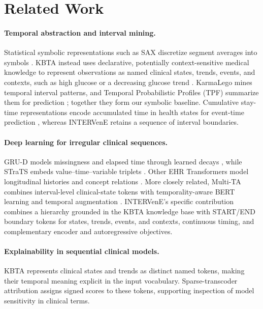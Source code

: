 \documentclass[letterpaper]{article} %
\begin{document}
\section{Related Work}

\paragraph{Temporal abstraction and interval mining.}
Statistical symbolic representations such as SAX discretize segment averages into symbols \citep{lin2003symbolic}. KBTA instead uses declarative, potentially context-sensitive medical knowledge to represent observations as named clinical states, trends, events, and contexts, such as high glucose or a decreasing glucose trend \citep{shahar1997framework}. KarmaLego mines temporal interval patterns, and Temporal Probabilistic Profiles (TPF) summarize them for prediction \citep{moskovitch2015karmalego,sheetrit2019tpf}; together they form our symbolic baseline. Cumulative stay-time representations encode accumulated time in health states for event-time prediction \citep{katsuki2022cumulative}, whereas INTERVenE retains a sequence of interval boundaries.

\paragraph{Deep learning for irregular clinical sequences.}
GRU-D models missingness and elapsed time through learned decays \citep{che2018recurrent}, while STraTS embeds value--time--variable triplets \citep{tipirneni2022strats}. Other EHR Transformers model longitudinal histories and concept relations \citep{li2020behrt,yang2023transformehr,huang2024heart}. More closely related, Multi-TA combines interval-level clinical-state tokens with temporality-aware BERT learning and temporal augmentation \citep{sohn2024multi}. INTERVenE's specific contribution combines a hierarchy grounded in the KBTA knowledge base with START/END boundary tokens for states, trends, events, and contexts, continuous timing, and complementary encoder and autoregressive objectives.

\paragraph{Explainability in sequential clinical models.}
KBTA represents clinical states and trends as distinct named tokens, making their temporal meaning explicit in the input vocabulary. Sparse-transcoder attribution \citep{dunefsky2024transcoders} assigns signed scores to these tokens, supporting inspection of model sensitivity in clinical terms.
\end{document}
